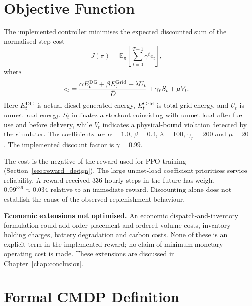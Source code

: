 \section{Objective Function}
\label{sec:objective}

\begin{revisedblock}
The implemented controller minimises the expected discounted
sum of the normalised step cost
\begin{equation}
J(\pi)=\mathbb E_{\pi}\!\left[
\sum_{t=0}^{T-1}\gamma^t c_t\right],
\label{eq:objective}
\end{equation}
where
\begin{equation}
c_t=
\frac{\alpha E_t^{\mathrm{DG}}+\beta E_t^{\mathrm{Grid}}+\lambda U_t}{\bar D}
+\gamma_r S_t+\mu V_t.
\label{eq:implemented_step_cost}
\end{equation}
Here $E_t^{\mathrm{DG}}$ is actual diesel-generated energy,
$E_t^{\mathrm{Grid}}$ is total grid energy, and $U_t$ is unmet
load energy. $S_t$ indicates a stockout coinciding with
unmet load after fuel use and before delivery, while $V_t$
indicates a physical-bound violation detected by the
simulator. The coefficients are $\alpha=1.0$, $\beta=0.4$,
$\lambda=100$, $\gamma_r=200$ and $\mu=20$.
The implemented discount factor is $\gamma=0.99$.

The cost is the negative of the reward used for PPO
training (Section~\ref{sec:reward_design}). The large
unmet-load coefficient prioritises service reliability.
A reward received 336 hourly steps in the future has
weight $0.99^{336}\approx0.034$ relative to an immediate
reward. Discounting alone does not establish the cause
of the observed replenishment behaviour.

\textbf{Economic extensions not optimised.}
An economic dispatch-and-inventory formulation could
add order-placement and ordered-volume costs, inventory
holding charges, battery degradation and carbon costs.
None of these is an explicit term in the implemented
reward; no claim of minimum monetary operating cost is
made. These extensions are discussed in
Chapter~\ref{chap:conclusion}.
\end{revisedblock}

\section{Formal CMDP Definition}
\label{sec:cmdp}

